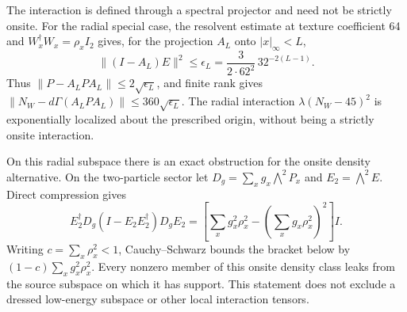 The interaction is defined through a spectral projector and need not be
strictly onsite. For the radial special case, the resolvent estimate at
texture coefficient 64 and $W_x^\dagger W_x=\rho_xI_2$ gives, for the projection $A_L$ onto
$|x|_\infty<L$,
\[
 \|(I-A_L)E\|^2\leq\epsilon_L
 =\frac{3}{2\cdot62^2}\,32^{-2(L-1)}.
\]
Thus $\|P-A_LPA_L\|\leq2\sqrt{\epsilon_L}$, and finite rank gives
$\|N_W-d\Gamma(A_LPA_L)\|\leq360\sqrt{\epsilon_L}$.
The radial interaction $\lambda(N_W-45)^2$ is exponentially localized about
the prescribed origin, without being a strictly onsite interaction.

On this radial subspace there is an exact obstruction for the onsite density alternative.
On the two-particle sector let
$D_g=\sum_xg_x\bigwedge^2 P_x$ and $E_2=\bigwedge^2 E$.  Direct
compression gives
\begin{equation}
 E_2^\dagger D_g(I-E_2E_2^\dagger)D_gE_2
 =\left[\sum_x g_x^2\rho_x^2-
              \left(\sum_xg_x\rho_x^2\right)^2\right]I.
 \label{eq:onsite-interaction-leakage}
\end{equation}
Writing $c=\sum_x\rho_x^2<1$, Cauchy--Schwarz bounds the bracket below
by $(1-c)\sum_xg_x^2\rho_x^2$.  Every nonzero member of this onsite
density class leaks from the source subspace on which it has support.
This statement does not exclude a dressed low-energy subspace or other
local interaction tensors.

